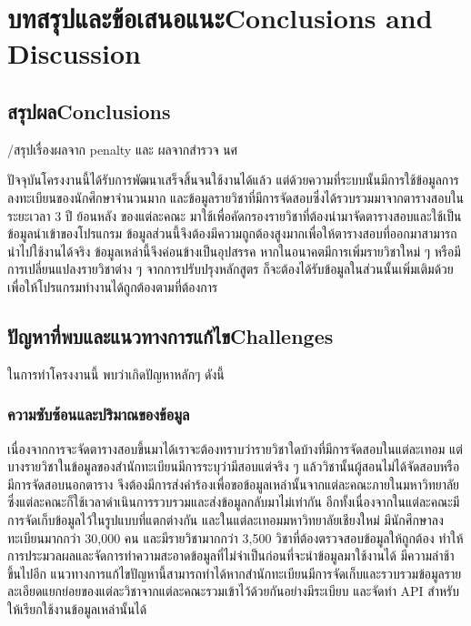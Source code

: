 \chapter{\ifcpe บทสรุปและข้อเสนอแนะ\else Conclusions and Discussion\fi}

\section{\ifcpe สรุปผล\else Conclusions\fi}

/สรุปเรื่องผลจาก penalty และ ผลจากสำรวจ นศ

ปัจจุบันโครงงานนี้ได้รับการพัฒนาเสร็จสิ้นจนใช้งานได้แล้ว แต่ด้วยความที่ระบบนั้นมีการใช้ข้อมูลการลงทะเบียนของนักศึกษาจำนวนมาก 
และข้อมูลรายวิชาที่มีการจัดสอบซึ่งได้รวบรวมมาจากตารางสอบในระยะเวลา 3 ปี ย้อนหลัง ของแต่ละคณะ 
มาใช้เพื่อคัดกรองรายวิชาที่ต้องนำมาจัดตารางสอบและใช้เป็นข้อมูลนำเข้าของโปรแกรม ข้อมูลส่วนนี้จึงต้องมีความถูกต้องสูงมากเพื่อให้ตารางสอบที่ออกมาสามารถนำไปใช้งานได้จริง
ข้อมูลเหล่านี้จึงค่อนข้างเป็นอุปสรรค หากในอนาคตมีการเพิ่มรายวิชาใหม่ ๆ หรือมีการเปลี่ยนแปลงรายวิชาต่าง ๆ จากการปรับปรุงหลักสูตร ก็จะต้องได้รับข้อมูลในส่วนนั้นเพิ่มเติมด้วย เพื่อให้โปรแกรมทำงานได้ถูกต้องตามที่ต้องการ

\section{\ifcpe ปัญหาที่พบและแนวทางการแก้ไข\else Challenges\fi}

ในการทำโครงงานนี้ พบว่าเกิดปัญหาหลักๆ ดังนี้
\subsection{ความซับซ้อนและปริมาณของข้อมูล}
เนื่องจากการจะจัดตารางสอบขึ้นมาได้เราจะต้องทราบว่ารายวิชาใดบ้างที่มีการจัดสอบในแต่ละเทอม 
แต่บางรายวิชาในข้อมูลของสำนักทะเบียนมีการระบุว่ามีสอบแต่จริง ๆ แล้ววิชานั้นผู้สอนไม่ได้จัดสอบหรือมีการจัดสอบนอกตาราง
จึงต้องมีการส่งคำร้องเพื่อขอข้อมูลเหล่านั้นจากแต่ละคณะภายในมหาวิทยาลัย ซึ่งแต่ละคณะก็ใช้เวลาดำเนินการรวบรวมและส่งข้อมูลกลับมาไม่เท่ากัน
อีกทั้งเนื่องจากในแต่ละคณะมีการจัดเก็บข้อมูลไว้ในรูปแบบที่แตกต่างกัน และในแต่ละเทอมมหาวิทยาลัยเชียงใหม่ 
มีนักศึกษาลงทะเบียนมากกว่า 30,000 คน และมีรายวิชามากกว่า 3,500 วิชาที่ต้องตรวจสอบข้อมูลให้ถูกต้อง
ทำให้การประมวลผลและจัดการทำความสะอาดข้อมูลที่ไม่จำเป็นก่อนที่จะนำข้อมูลมาใช้งานได้ มีความล่าช้าขึ้นไปอีก 
แนวทางการแก้ไขปัญหานี้สามารถทำได้หากสำนักทะเบียนมีการจัดเก็บและรวบรวมข้อมูลรายละเอียดแยกย่อยของแต่ละวิชาจากแต่ละคณะรวมเข้าไว้ด้วยกันอย่างมีระเบียบ
และจัดทำ API สำหรับให้เรียกใช้งานข้อมูลเหล่านั้นได้
